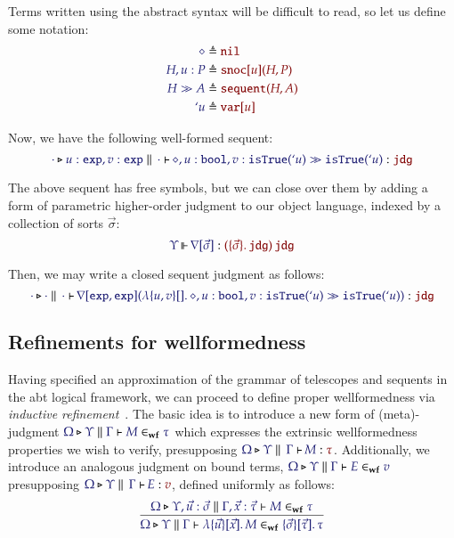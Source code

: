 \documentclass[11pt]{article}
\theoremstyle{definition}
\theoremstyle{remark}
\numberwithin{equation}{section}
\def\IModeColorName{MidnightBlue}
\def\OModeColorName{Maroon}
\newcommand\IMode[1]{{\color{\IModeColorName}{#1}}}
\newcommand\OMode[1]{{\color{\OModeColorName}{#1}}}
\newcommand\MkValence[3]{%
  \ifthenelse{\equal{#1}{}}{}{%
    \{#1\}%
  }%
  \ifthenelse{\equal{#2}{}}{}{%
    [#2]%
  }.\, #3%
}
\newcommand\MkBTm[3]{\mathbb{\lambda}\{#1\}[#2].\, #3}
\newcommand\MkArity[2]{(#1)\, #2}
\newcommand\IsOperator[3]{
  \IMode{#1}\,{\Vdash}\,\IMode{#2}: \OMode{#3}
}
\newcommand\IsAbt[5]{%
  \IMode{#1}\triangleright%
  \IMode{#2}\parallel%
  \,{\IMode{#3}\vdash}\,%
  \IMode{#4}:\OMode{#5}%
}
\newcommand\IsWf[5]{%
  \IMode{#1}\triangleright%
  \IMode{#2}\parallel%
  \IMode{#3}\vdash%
  \IMode{#4}\in_{\mathbf{wf}}\IMode{#5}%
}
\newcommand\App[2]{#1(#2)}
\newcommand\SortExp{\mathtt{exp}}
\begin{document}
Terms written using the abstract syntax will be difficult to read, so let us
define some notation:
\begin{align*}
  \IMode{\diamond} &\triangleq \OMode{\OpNil}\\
  \IMode{H, u:P} &\triangleq \OMode{
    \App{\OpSnoc{u}}{H, P}
  }\\
  \IMode{H\gg A} &\triangleq \OMode{
    \App{\OpSequent}{
      H, A
    }
  }\\
  \IMode{`u} &\triangleq \OMode{\OpVar{u}}
\end{align*}

Now, we have the following well-formed sequent:
\[
  \IsAbt{\cdot}{
    u:\SortExp,
    v:\SortExp
  }{\cdot}{
    \diamond,u:\OpBool,v:\App{\OpSo}{`u}%
    \gg%
    \App{\OpSo}{`u}
  }{\SortJdg}
\]

\newcommand\OpNabla[1]{\nabla[#1]}

The above sequent has free symbols, but we can close over them by adding a form
of parametric higher-order judgment to our object language, indexed by a
collection of sorts $\vec{\sigma}$:
\[
  \IsOperator{\Upsilon}{\OpNabla{\vec{\sigma}}}{
    \MkArity{
      \MkValence{\vec{\sigma}}{}{\SortJdg}
    }{\SortJdg}
  }
\]

Then, we may write a closed sequent judgment as follows:
\[
  \IsAbt{\cdot}{\cdot}{\cdot}{
    \App{\OpNabla{\SortExp,\SortExp}}{
      \MkBTm{u,v}{}{
        \diamond,u:\OpBool,v:\App{\OpSo}{`u}%
        \gg%
        \App{\OpSo}{`u}
      }
    }
  }{\SortJdg}
\]

\subsection{Refinements for wellformedness}

Having specified an approximation of the grammar of telescopes and sequents in
the abt logical framework, we can proceed to define proper wellformedness via
\emph{inductive refinement}~\cite{harper:2016}. The basic idea is to introduce a new form of
(meta)-judgment $\IsWf{\Omega}{\Upsilon}{\Gamma}{M}{\tau}$ which expresses the
extrinsic wellformedness properties we wish to verify, presupposing
$\IsAbt{\Omega}{\Upsilon}{\Gamma}{M}{\tau}$. Additionally, we introduce an
analogous judgment on bound terms, $\IsWf{\Omega}{\Upsilon}{\Gamma}{E}{v}$
presupposing $\IsAbt{\Omega}{\Upsilon}{\Gamma}{E}{v}$, defined uniformly as
follows:
\[
  \infer{
    \IsWf{\Omega}{\Upsilon}{\Gamma}{
      \MkBTm{\vec{u}}{\vec{x}}{M}
    }{
      \MkValence{\vec{\sigma}}{\vec{\tau}}{\tau}
    }
  }{
    \IsWf{\Omega}{\Upsilon,\vec{u}:\vec{\sigma}}{\Gamma,\vec{x}:\vec{\tau}}{M}{\tau}
  }
\]
\end{document}
